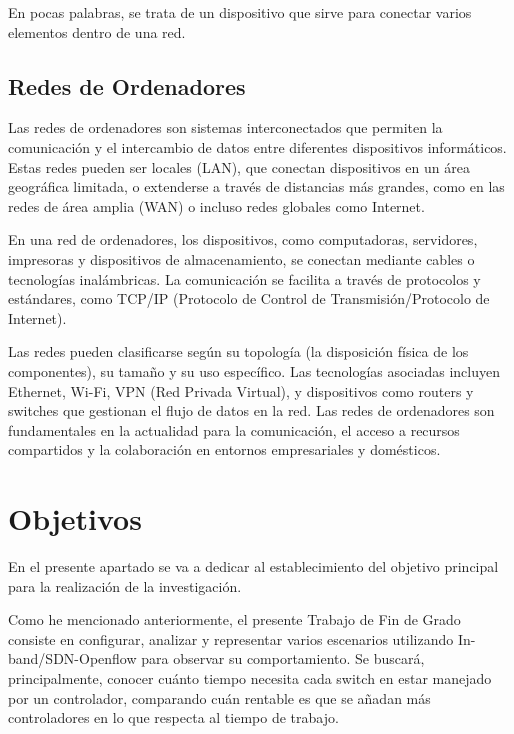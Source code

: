 \documentclass[a4paper, 12pt]{book}
\begin{document}
	En pocas palabras, se trata de un dispositivo que sirve para conectar varios elementos dentro de una red.
	
	\section{Redes de Ordenadores} 
	\label{sec:redes}
	
	Las redes de ordenadores son sistemas interconectados que permiten la comunicación y el intercambio de datos entre diferentes dispositivos informáticos. Estas redes pueden ser locales (LAN), que conectan dispositivos en un área geográfica limitada, o extenderse a través de distancias más grandes, como en las redes de área amplia (WAN) o incluso redes globales como Internet.
	
	En una red de ordenadores, los dispositivos, como computadoras, servidores, impresoras y dispositivos de almacenamiento, se conectan mediante cables o tecnologías inalámbricas. La comunicación se facilita a través de protocolos y estándares, como TCP/IP (Protocolo de Control de Transmisión/Protocolo de Internet).
	
	Las redes pueden clasificarse según su topología (la disposición física de los componentes), su tamaño y su uso específico. Las tecnologías asociadas incluyen Ethernet, Wi-Fi, VPN (Red Privada Virtual), y dispositivos como routers y switches que gestionan el flujo de datos en la red. Las redes de ordenadores son fundamentales en la actualidad para la comunicación, el acceso a recursos compartidos y la colaboración en entornos empresariales y domésticos.
	
	
	\cleardoublepage %
	\chapter{Objetivos} %
	\label{chap:objetivos} %
	
	En el presente apartado se va a dedicar al establecimiento del objetivo principal para la realización de la investigación. 
	
	Como he mencionado anteriormente, el presente Trabajo de Fin de Grado consiste en configurar, analizar y representar varios escenarios utilizando In-band/SDN-Openflow para observar su comportamiento. Se buscará, principalmente, conocer cuánto tiempo necesita cada switch en estar manejado por un controlador, comparando cuán  rentable es que se añadan más controladores en lo que respecta al tiempo de trabajo.
	
\end{document}
